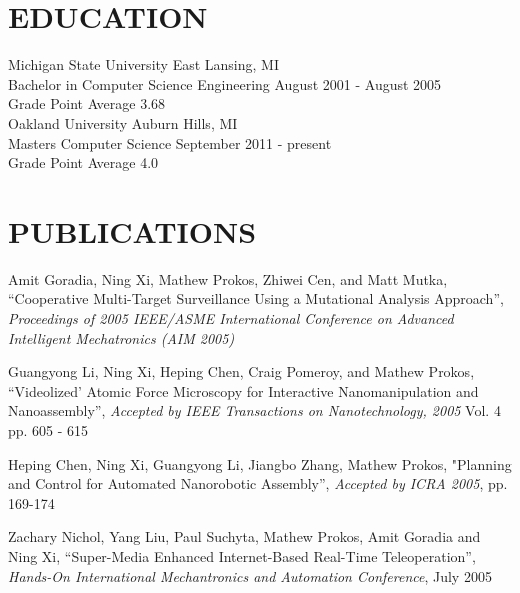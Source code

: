 \documentclass[line]{res}
\begin{document}
\begin{resume}
\section{EDUCATION} 
\vspace{1mm}
   Michigan State University \hfill East Lansing, MI\\
   Bachelor in Computer Science Engineering \hfill August 2001 - August 2005\\
   Grade Point Average 3.68\\

   \vspace{-5mm}
   Oakland University \hfill Auburn Hills, MI\\
   Masters Computer Science \hfill September 2011 - present\\
   Grade Point Average 4.0\\

\section{PUBLICATIONS} 
\vspace{1mm}
   Amit Goradia, Ning Xi, Mathew Prokos, Zhiwei Cen, and Matt Mutka,
   ``Cooperative Multi-Target Surveillance Using a Mutational Analysis Approach'',
   \textsl{Proceedings of 2005 IEEE/ASME International Conference on
      Advanced Intelligent Mechatronics (AIM 2005)}

   \vspace{-2mm}
   Guangyong Li, Ning Xi, Heping Chen, Craig Pomeroy, and Mathew Prokos,
   ``Videolized' Atomic Force Microscopy for Interactive Nanomanipulation and Nanoassembly'',
   \textsl{Accepted by IEEE Transactions on Nanotechnology, 2005} Vol. 4 pp. 605 - 615

   \vspace{-2mm}
   Heping Chen, Ning Xi, Guangyong Li, Jiangbo Zhang, Mathew Prokos,
   "Planning and Control for Automated Nanorobotic Assembly'',
   \textsl{Accepted by ICRA 2005}, pp. 169-174

   \vspace{-2mm}
   Zachary Nichol, Yang Liu, Paul Suchyta, Mathew Prokos, Amit Goradia and Ning Xi, 
   ``Super-Media Enhanced Internet-Based Real-Time Teleoperation'',
   \textsl{Hands-On International Mechantronics and Automation Conference}, July 2005
\end{resume}
\end{document}
